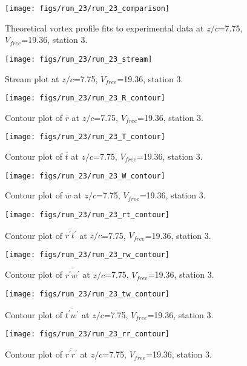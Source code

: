 \begin{figure}[H]
\centering
\texttt{[image: figs/run\_23/run\_23\_comparison]}
\caption{Theoretical vortex profile fits to experimental data at $z/c$=7.75, $V_{free}$=19.36, station 3.}
\end{figure}


\begin{figure}[H]
\centering
\texttt{[image: figs/run\_23/run\_23\_stream]}
\caption{Stream plot at $z/c$=7.75, $V_{free}$=19.36, station 3.}
\end{figure}


\begin{figure}[H]
\centering
\texttt{[image: figs/run\_23/run\_23\_R\_contour]}
\caption{Contour plot of $\overline{r}$ at $z/c$=7.75, $V_{free}$=19.36, station 3.}
\end{figure}


\begin{figure}[H]
\centering
\texttt{[image: figs/run\_23/run\_23\_T\_contour]}
\caption{Contour plot of $\overline{t}$ at $z/c$=7.75, $V_{free}$=19.36, station 3.}
\end{figure}


\begin{figure}[H]
\centering
\texttt{[image: figs/run\_23/run\_23\_W\_contour]}
\caption{Contour plot of $\overline{w}$ at $z/c$=7.75, $V_{free}$=19.36, station 3.}
\end{figure}


\begin{figure}[H]
\centering
\texttt{[image: figs/run\_23/run\_23\_rt\_contour]}
\caption{Contour plot of $\overline{r^\prime t^\prime}$ at $z/c$=7.75, $V_{free}$=19.36, station 3.}
\end{figure}


\begin{figure}[H]
\centering
\texttt{[image: figs/run\_23/run\_23\_rw\_contour]}
\caption{Contour plot of $\overline{r^\prime w^\prime}$ at $z/c$=7.75, $V_{free}$=19.36, station 3.}
\end{figure}


\begin{figure}[H]
\centering
\texttt{[image: figs/run\_23/run\_23\_tw\_contour]}
\caption{Contour plot of $\overline{t^\prime w^\prime}$ at $z/c$=7.75, $V_{free}$=19.36, station 3.}
\end{figure}


\begin{figure}[H]
\centering
\texttt{[image: figs/run\_23/run\_23\_rr\_contour]}
\caption{Contour plot of $\overline{r^\prime r^\prime}$ at $z/c$=7.75, $V_{free}$=19.36, station 3.}
\end{figure}



